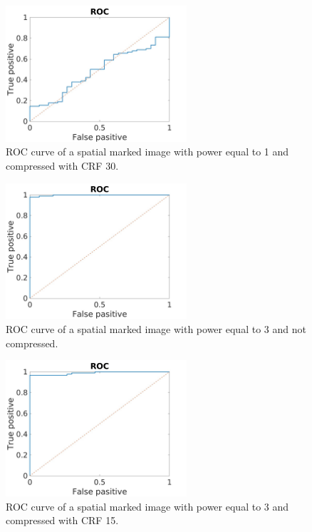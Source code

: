 \begin{figure}[h!]
\centering
\includegraphics[width=0.6\textwidth]{./img/ROC/ROC_gauss_1_30.jpg}
\caption{\small{ROC curve of a spatial marked image with power equal to 1 and compressed with CRF 30.}}
\label{fig:g1crf30}
\end{figure}
\begin{figure}[h!]
\centering
\includegraphics[width=0.6\textwidth]{./img/ROC/ROC_gauss_3_1.jpg}
\caption{\small{ROC curve of a spatial marked image with power equal to 3 and not compressed. }}
\label{fig:g3crf1}
\end{figure}
\begin{figure}[h!]
\centering
\includegraphics[width=0.6\textwidth]{./img/ROC/ROC_gauss_3_15.jpg}
\caption{\small{ROC curve of a spatial marked image with power equal to 3 and compressed with CRF 15. }}
\label{fig:g3crf15}
\end{figure}
